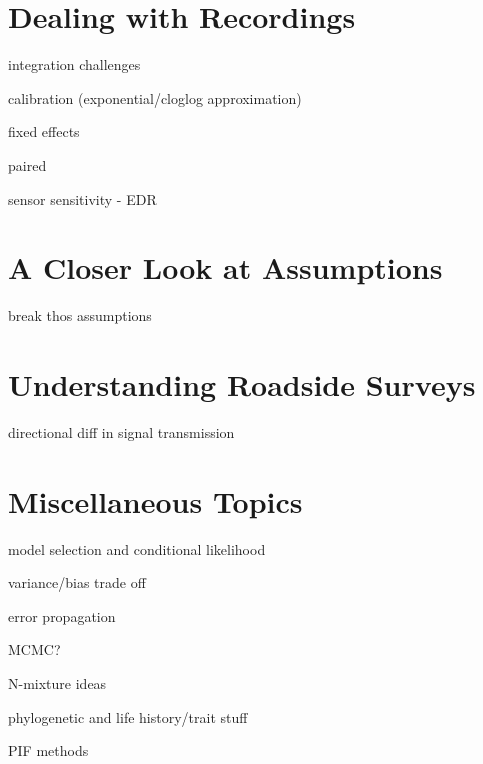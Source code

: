 \documentclass[12pt,]{book}
\begin{document}
\hypertarget{recordings}{%
\chapter{Dealing with Recordings}\label{recordings}}

integration challenges

calibration (exponential/cloglog approximation)

fixed effects

paired

sensor sensitivity - EDR

\hypertarget{assumptions}{%
\chapter{A Closer Look at Assumptions}\label{assumptions}}

break thos assumptions

\hypertarget{roadsides}{%
\chapter{Understanding Roadside Surveys}\label{roadsides}}

directional diff in signal transmission

\hypertarget{extras}{%
\chapter{Miscellaneous Topics}\label{extras}}

model selection and conditional likelihood

variance/bias trade off

error propagation

MCMC?

N-mixture ideas

phylogenetic and life history/trait stuff

PIF methods


\end{document}
